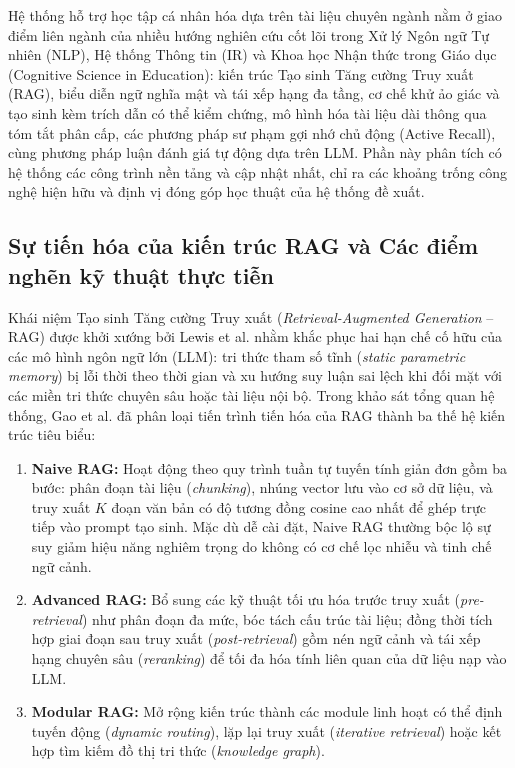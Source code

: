﻿\documentclass[12pt]{article}
\begin{document}
Hệ thống hỗ trợ học tập cá nhân hóa dựa trên tài liệu chuyên ngành nằm ở giao điểm liên ngành của nhiều hướng nghiên cứu cốt lõi trong Xử lý Ngôn ngữ Tự nhiên (NLP), Hệ thống Thông tin (IR) và Khoa học Nhận thức trong Giáo dục (Cognitive Science in Education): kiến trúc Tạo sinh Tăng cường Truy xuất (RAG), biểu diễn ngữ nghĩa mật và tái xếp hạng đa tầng, cơ chế khử ảo giác và tạo sinh kèm trích dẫn có thể kiểm chứng, mô hình hóa tài liệu dài thông qua tóm tắt phân cấp, các phương pháp sư phạm gợi nhớ chủ động (Active Recall), cùng phương pháp luận đánh giá tự động dựa trên LLM. Phần này phân tích có hệ thống các công trình nền tảng và cập nhật nhất, chỉ ra các khoảng trống công nghệ hiện hữu và định vị đóng góp học thuật của hệ thống đề xuất.

\subsection{Sự tiến hóa của kiến trúc RAG và Các điểm nghẽn kỹ thuật thực tiễn}
Khái niệm Tạo sinh Tăng cường Truy xuất (\textit{Retrieval-Augmented Generation} -- RAG) được khởi xướng bởi Lewis et al. \cite{lewis2020retrieval} nhằm khắc phục hai hạn chế cố hữu của các mô hình ngôn ngữ lớn (LLM): tri thức tham số tĩnh (\textit{static parametric memory}) bị lỗi thời theo thời gian và xu hướng suy luận sai lệch khi đối mặt với các miền tri thức chuyên sâu hoặc tài liệu nội bộ. Trong khảo sát tổng quan hệ thống, Gao et al. \cite{gao2023rag_survey} đã phân loại tiến trình tiến hóa của RAG thành ba thế hệ kiến trúc tiêu biểu:
\begin{enumerate}
    \item \textbf{Naive RAG:} Hoạt động theo quy trình tuần tự tuyến tính giản đơn gồm ba bước: phân đoạn tài liệu (\textit{chunking}), nhúng vector lưu vào cơ sở dữ liệu, và truy xuất $K$ đoạn văn bản có độ tương đồng cosine cao nhất để ghép trực tiếp vào prompt tạo sinh. Mặc dù dễ cài đặt, Naive RAG thường bộc lộ sự suy giảm hiệu năng nghiêm trọng do không có cơ chế lọc nhiễu và tinh chế ngữ cảnh.
    \item \textbf{Advanced RAG:} Bổ sung các kỹ thuật tối ưu hóa trước truy xuất (\textit{pre-retrieval}) như phân đoạn đa mức, bóc tách cấu trúc tài liệu; đồng thời tích hợp giai đoạn sau truy xuất (\textit{post-retrieval}) gồm nén ngữ cảnh và tái xếp hạng chuyên sâu (\textit{reranking}) để tối đa hóa tính liên quan của dữ liệu nạp vào LLM.
    \item \textbf{Modular RAG:} Mở rộng kiến trúc thành các module linh hoạt có thể định tuyến động (\textit{dynamic routing}), lặp lại truy xuất (\textit{iterative retrieval}) hoặc kết hợp tìm kiếm đồ thị tri thức (\textit{knowledge graph}).
\end{enumerate}
\end{document}

